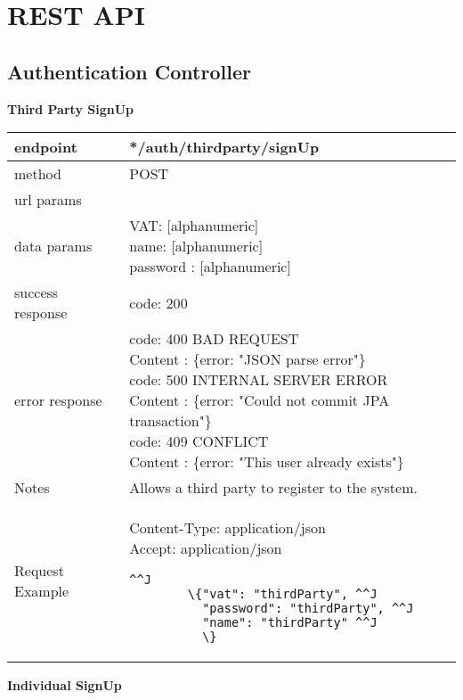 \section{REST API} 



\subsection{Authentication Controller}

\textbf{Third Party SignUp} \\

\begin{tabularx}{\linewidth}{| l| l }
	\hline
	endpoint & */auth/thirdparty/signUp \\
	\hline
	method & POST \\
	\hline
	url params & \\
	\hline
	data params &
	\parbox{0.7\textwidth}{
		\bigskip
		VAT: [alphanumeric]\\
		name: [alphanumeric]\\
		password : [alphanumeric]
		\bigskip
	} \\
	\hline
	success response &
	\parbox{0.7\textwidth}{
		\bigskip
		code: 200\\
	} \\
	\hline
	error response &
	\parbox{0.7\textwidth}{
		\bigskip
		code: 400 BAD REQUEST \\
		Content : \{error: "JSON parse error"\}\\
		code: 500 INTERNAL SERVER ERROR \\
		Content : \{error: "Could not commit JPA transaction"\}\\
		code: 409 CONFLICT \\
		Content : \{error: "This user already exists"\}
		\bigskip
	} \\
	\hline
	Notes & 
	\parbox{0.7\textwidth}{
		\bigskip Allows a third party to register to the system.
	\bigskip}  \\
	\hline
		Request Example & 
		\parbox{0.8\textwidth}{
		\bigskip
		Content-Type: application/json \\
		Accept: application/json \\
		\bigskip
		\begin{lstlisting}^^J
		\{"vat": "thirdParty", ^^J
		  "password": "thirdParty", ^^J
		  "name": "thirdParty" ^^J
		  \}
		\end{lstlisting}
	} \\
	\hline
\end{tabularx}
\newpage
\textbf{Individual SignUp} \\

